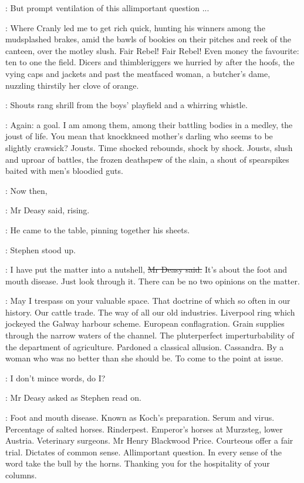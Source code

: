 \deasy:
But prompt ventilation of this allimportant question ...

\StephenInt:
Where Cranly led me to get rich quick,
hunting his winners among the mudsplashed brakes,
amid the bawls of bookies on their pitches and reek of the canteen,
over the motley slush.
Fair Rebel!
Fair Rebel!
Even money the favourite:
ten to one the field.
Dicers and thimbleriggers we hurried by after the hoofs,
the vying caps and jackets
and past the meatfaced woman,
a butcher's dame,
nuzzling thirstily her clove of orange.

:
Shouts rang shrill from the boys' playfield and a whirring whistle.

\StephenInt:
Again: a goal.
I am among them, among their battling bodies in a medley,
the joust of life.
You mean that knockkneed mother's darling who seems to be slightly crawsick?
Jousts.
Time shocked rebounds, shock by shock.
Jousts, slush and uproar of battles, the frozen deathspew of the slain,
a shout of spearspikes baited with men's bloodied guts.

\deasy:
Now then,

:
Mr Deasy said, rising.

:
He came to the table, pinning together his sheets.

:
Stephen stood up.

\deasy:
I have put the matter into a nutshell, \sout{Mr Deasy said.}
It's about the foot and mouth disease.
Just look through it.
There can be no two opinions on the matter.

\StephenInt: \stage{[Paraphrasing]}
May I trespass on your valuable space.
That doctrine of  which so often in our history.
Our cattle trade.
The way of all our old industries.
Liverpool ring which jockeyed the Galway harbour scheme.
European conflagration.
Grain supplies through the narrow waters of the channel.
The pluterperfect imperturbability of the department of agriculture.
Pardoned a classical allusion.
Cassandra.
By a woman who was no better than she should be.
To come to the point at issue.

\deasy:
I don't mince words, do I?

:
Mr Deasy asked as Stephen read on.

\StephenInt: 
Foot and mouth disease.
Known as Koch's preparation.
Serum and virus.
Percentage of salted horses.
Rinderpest.
Emperor's horses at Murzsteg, lower Austria.
Veterinary surgeons.
Mr Henry Blackwood Price.
Courteous offer a fair trial.
Dictates of common sense.
Allimportant question.
In every sense of the word take the bull by the horns.
Thanking you for the hospitality of your columns.

